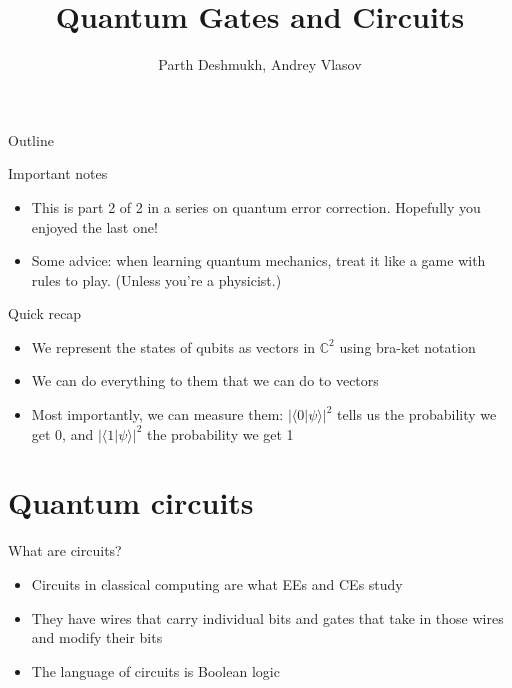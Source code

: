 \documentclass[aspectratio=169, handout]{beamer}
\title{Quantum Gates and Circuits}
\author{Parth Deshmukh, Andrey Vlasov}
\date{}
\begin{document}

\begin{frame}
\titlepage
\end{frame}

\begin{frame}{Outline}
  \tableofcontents
\end{frame}

\begin{frame}{Important notes}
  \begin{itemize}
    \item This is part 2 of 2 in a series on quantum error correction. Hopefully you enjoyed the last one!
    \item Some advice: when learning quantum mechanics, treat it like a game with rules to play. (Unless you're a physicist.)
  \end{itemize}
\end{frame}

\begin{frame}{Quick recap}
    \begin{itemize}
        \item We represent the states of qubits as vectors in $\mathbb{C}^2$ using bra-ket notation \pause
        \item We can do everything to them that we can do to vectors \pause
        \item Most importantly, we can measure them: $|\langle 0 | \psi \rangle|^2$ tells us the probability we get 0, and $|\langle 1 | \psi \rangle|^2$ the probability we get 1
    \end{itemize}
\end{frame}

\section{Quantum circuits}
\frame{\sectionpage}
\begin{frame}{What are circuits?}
    \begin{itemize}
        \item Circuits in classical computing are what EEs and CEs study \pause
        \item They have \textcolor{sigma@mainblue}{wires} that carry individual bits and \textcolor{sigma@mainblue}{gates} that take in those wires and modify their bits \pause
        \item The language of circuits is \textcolor{sigma@mainblue}{Boolean logic}
    \end{itemize}
\end{frame}
\end{document}
